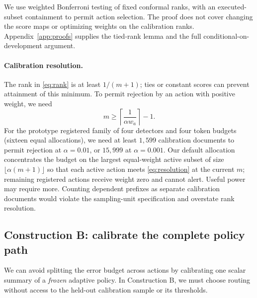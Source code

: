 \documentclass[pdflatex,sn-mathphys-num]{sn-jnl}
\begin{document}
We use weighted Bonferroni testing of fixed conformal ranks, with an executed-subset containment to permit action selection. The proof does not cover changing the score maps or optimizing weights on the calibration ranks. Appendix~\ref{app:proofs} supplies the tied-rank lemma and the full conditional-on-development argument.

\paragraph*{Calibration resolution.}
The rank in \eqref{eq:rank} is at least \(1/(m+1)\); ties or constant scores can prevent attainment of this minimum. To permit rejection by an action with positive weight, we need
\begin{equation}
 m\geq \left\lceil\frac{1}{\alpha w_a}\right\rceil-1.
 \label{eq:resolution}
\end{equation}
For the prototype registered family of four detectors and four token budgets (sixteen equal allocations), we need at least \(1{,}599\) calibration documents to permit rejection at \(\alpha=0.01\), or \(15{,}999\) at \(\alpha=0.001\). Our default allocation concentrates the budget on the largest equal-weight active subset of size \(\lfloor\alpha(m+1)\rfloor\) so that each active action meets \eqref{eq:resolution} at the current \(m\); remaining registered actions receive weight zero and cannot alert. Useful power may require more. Counting dependent prefixes as separate calibration documents would violate the sampling-unit specification and overstate rank resolution.

\subsection{Construction B: calibrate the complete policy path}

We can avoid splitting the error budget across actions by calibrating one scalar summary of a \emph{frozen} adaptive policy. In Construction B, we must choose routing without access to the held-out calibration sample or its thresholds.
\end{document}
